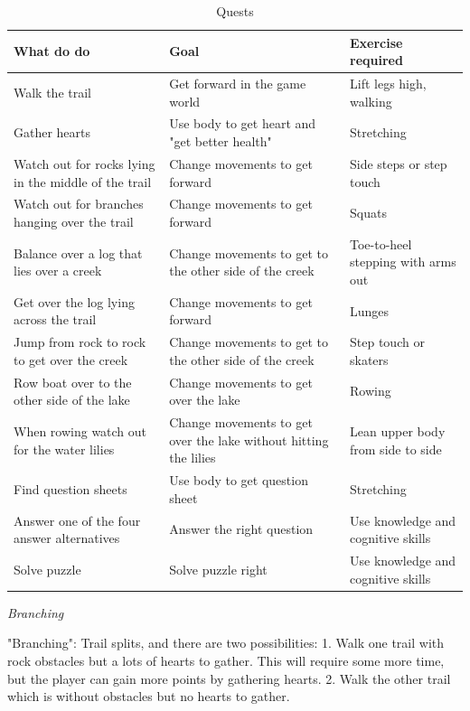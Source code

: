 \begin{table}
     \begin{tabular}{|>{\raggedright}p{}|>{\raggedright}p{4cm}|p{}|}
       \hline
        \textbf{What do do} & \textbf{Goal} & \textbf{Exercise required}  \\ \hline
       Walk the trail & Get forward in the game world & Lift legs high, walking  \\ \hline
       Gather hearts & Use body to get heart and "get better health" &  Stretching \\ \hline
	   Watch out for rocks lying in the middle of the trail & Change movements to get forward & Side steps or step touch  \\ \hline
	     Watch out for branches hanging over the trail & Change movements to get forward & Squats
	      \\ \hline
	       Balance over a log that lies over a creek & Change movements to get to the other side of the creek & Toe-to-heel stepping with arms out \\ \hline
	       Get over the log lying across the trail & Change movements to get forward & Lunges \\ \hline
	       Jump from rock to rock to get over the creek & Change movements to get to the other side of the creek & Step touch or skaters \\ \hline
	       Row boat over to the other side of the lake & Change movements to get over the lake  & Rowing \\ \hline
	       When rowing watch out for the water lilies & Change movements to get over the lake without hitting the lilies  & Lean upper body from side to side \\ \hline
	       Find question sheets & Use body to get question sheet  & Stretching \\ \hline
	       Answer one of the four answer alternatives & Answer the right question  & Use knowledge and cognitive skills \\ \hline
	       Solve puzzle & Solve puzzle right  & Use knowledge and cognitive skills \\ \hline
      \end{tabular}
      \caption[Quests in the "Nature trail" game]{Quests}
    \label{tab:quests1}
 \end{table}
 
\emph{Branching}
 
"Branching": Trail splits, and there are two possibilities: 1. Walk one trail with rock obstacles but a lots of hearts to gather. This will require some more time, but the player can gain more points by gathering hearts. 2. Walk the other trail which is without obstacles but no hearts to gather. 

